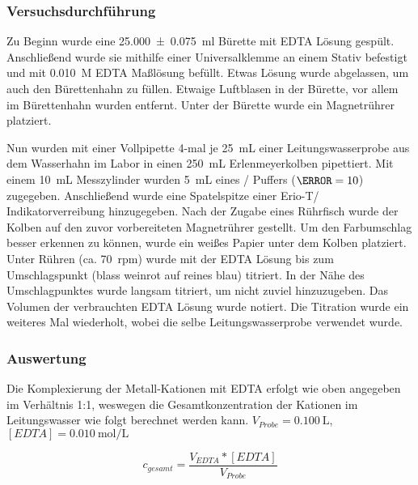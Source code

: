 \documentclass{article}
\begin{document}
      \subsubsection{Versuchsdurchführung} \label{sec:Versucharte}
        Zu Beginn wurde eine \SI[mode=text,separate-uncertainty=true]{25.000(75)}{\milli\litre} Bürette mit EDTA Lösung gespült. Anschließend wurde sie mithilfe einer Universalklemme an einem Stativ befestigt und mit \SI[mode=text]{0.010}{M} EDTA Maßlösung befüllt. Etwas Lösung wurde abgelassen, um auch den Bürettenhahn zu füllen. Etwaige Luftblasen in der Bürette, vor allem im Bürettenhahn wurden entfernt. Unter der Bürette wurde ein Magnetrührer platziert. 
        
        Nun wurden mit einer Vollpipette 4-mal je \SI[mode=text]{25}{\milli\liter} einer Leitungswasserprobe aus dem Wasserhahn im Labor in einen \SI[mode=text]{250}{\milli\liter} Erlenmeyerkolben pipettiert. Mit einem \SI[mode=text]{10}{\milli\liter} Messzylinder wurden \SI[mode=text]{5}{\milli\liter} eines / Puffers ($\pH=10$) zugegeben. Anschließend wurde eine Spatelspitze einer Erio-T/ Indikatorverreibung hinzugegeben. Nach der Zugabe eines Rührfisch wurde der Kolben auf den zuvor vorbereiteten Magnetrührer gestellt. Um den Farbumschlag besser erkennen zu können, wurde ein weißes Papier unter dem Kolben platziert.  Unter Rühren (ca. \SI[mode=text]{70}{rpm}) wurde mit der EDTA Lösung bis zum Umschlagspunkt (blass weinrot auf reines blau) titriert. In der Nähe des Umschlagpunktes wurde langsam titriert, um nicht zuviel hinzuzugeben. Das Volumen der verbrauchten EDTA Lösung wurde notiert. Die Titration wurde ein weiteres Mal wiederholt, wobei die selbe Leitungswasserprobe verwendet wurde.
        
      \subsubsection{Auswertung}
        
        Die Komplexierung der Metall-Kationen mit EDTA erfolgt wie oben angegeben im Verhältnis 1:1, weswegen die Gesamtkonzentration der Kationen im Leitungswasser wie folgt berechnet werden kann. $V_{Probe} = \SI[mode=text]{0.100}{\liter}$, $[EDTA] = \SI[mode=text]{0.010}{\mole\per\liter}$
        
        \begin{equation}
           c_{gesamt} = \frac{V_{EDTA} * [EDTA]}{V_{Probe}} \label{eq:ED}
        \end{equation}
         
\end{document}
